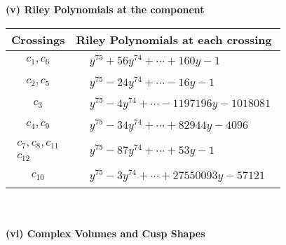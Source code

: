 \documentclass[1p]{elsarticle_modified}
\theoremstyle{definition}
\begin{document}
\newpage\renewcommand{\arraystretch}{1}
\flushleft \textbf{(v) Riley Polynomials at the component}\newline \\
\begin{tabular}{m{50pt}|m{274pt}}
Crossings & \hspace{64pt}Riley Polynomials at each crossing \\
\hline $$\begin{aligned}c_{1},c_{6}\end{aligned}$$&$\begin{aligned}
&y^{75}+56 y^{74}+\cdots+160 y-1
\end{aligned}$\\
\hline $$\begin{aligned}c_{2},c_{5}\end{aligned}$$&$\begin{aligned}
&y^{75}-24 y^{74}+\cdots-16 y-1
\end{aligned}$\\
\hline $$\begin{aligned}c_{3}\end{aligned}$$&$\begin{aligned}
&y^{75}-4 y^{74}+\cdots-1197196 y-1018081
\end{aligned}$\\
\hline $$\begin{aligned}c_{4},c_{9}\end{aligned}$$&$\begin{aligned}
&y^{75}-34 y^{74}+\cdots+82944 y-4096
\end{aligned}$\\
\hline $$\begin{aligned}c_{7},c_{8},c_{11}\\c_{12}\end{aligned}$$&$\begin{aligned}
&y^{75}-87 y^{74}+\cdots+53 y-1
\end{aligned}$\\
\hline $$\begin{aligned}c_{10}\end{aligned}$$&$\begin{aligned}
&y^{75}-3 y^{74}+\cdots+27550093 y-57121
\end{aligned}$\\
\hline
\end{tabular}\\~\\
\newpage\flushleft \textbf{(vi) Complex Volumes and Cusp Shapes}
\end{document}
